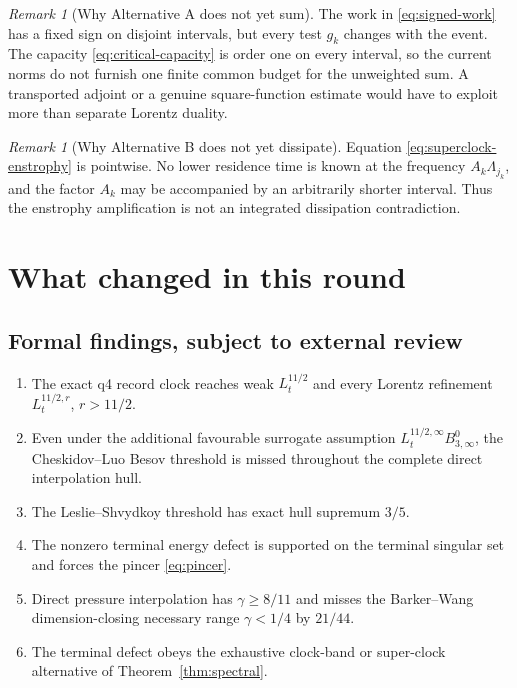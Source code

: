 \documentclass[11pt]{article}
\theoremstyle{remark}
\newtheorem{remark}[theorem]{Remark}
\begin{document}
\begin{remark}[Why Alternative A does not yet sum]
The work in \eqref{eq:signed-work} has a fixed sign on disjoint
intervals, but every test \(g_k\) changes with the event.  The capacity
\eqref{eq:critical-capacity} is order one on every interval, so the
current norms do not furnish one finite common budget for the
unweighted sum.  A transported adjoint or a genuine square-function
estimate would have to exploit more than separate Lorentz duality.
\end{remark}

\begin{remark}[Why Alternative B does not yet dissipate]
Equation \eqref{eq:superclock-enstrophy} is pointwise.  No lower
residence time is known at the frequency
\(A_k\Lambda_{j_k}\), and the factor \(A_k\) may be accompanied by an
arbitrarily shorter interval.  Thus the enstrophy amplification is not
an integrated dissipation contradiction.
\end{remark}

\section{What changed in this round}

\subsection*{Formal findings, subject to external review}

\begin{enumerate}
\item The exact q4 record clock reaches weak
\(L_t^{11/2}\) and every Lorentz refinement
\(L_t^{11/2,r}\), \(r>11/2\).
\item Even under the additional favourable surrogate assumption
\(L_t^{11/2,\infty}B^0_{3,\infty}\), the Cheskidov--Luo Besov threshold
is missed throughout the complete direct interpolation hull.
\item The Leslie--Shvydkoy threshold has exact hull supremum \(3/5\).
\item The nonzero terminal energy defect is supported on the terminal
singular set and forces the pincer \eqref{eq:pincer}.
\item Direct pressure interpolation has
\(\gamma\geq8/11\) and misses the Barker--Wang
dimension-closing necessary range \(\gamma<1/4\) by \(21/44\).
\item The terminal defect obeys the exhaustive clock-band or
super-clock alternative of Theorem~\ref{thm:spectral}.
\end{enumerate}
\end{document}
